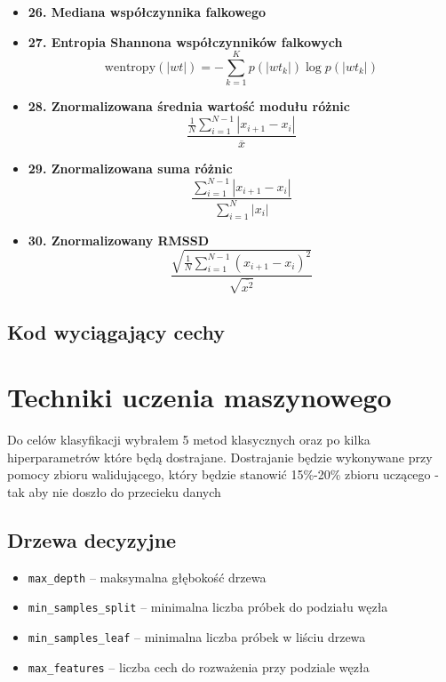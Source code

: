 \documentclass[12pt,titlepage]{article}
\begin{document}
\begin{itemize}
    \item \textbf{26. Mediana współczynnika falkowego}  


    \item \textbf{27. Entropia Shannona współczynników falkowych}  
    \[
    \text{wentropy}(|wt|) = -\sum_{k=1}^{K} p(|wt_k|) \log p(|wt_k|)
    \]

    \item \textbf{28. Znormalizowana średnia wartość modułu różnic}  
\[
\frac{\frac{1}{N}\sum_{i=1}^{N-1} |x_{i+1} - x_i|}{\overline{x}}
\]

    \item \textbf{29. Znormalizowana suma różnic}  
    \[
    \frac{\sum_{i=1}^{N-1} |x_{i+1} - x_i|}{\sum_{i=1}^{N} |x_i|}
    \]

    \item \textbf{30. Znormalizowany RMSSD}  
    \[
    \frac{\sqrt{\frac{1}{N}\sum_{i=1}^{N-1} (x_{i+1} - x_i)^2}}{\sqrt{\overline{x^2}}}
    \]
\end{itemize}
\newpage
\subsection{Kod wyciągający cechy}

\section{Techniki uczenia maszynowego}

Do celów klasyfikacji wybrałem 5 metod klasycznych oraz po kilka hiperparametrów które będą dostrajane. Dostrajanie będzie wykonywane przy pomocy zbioru walidującego, który będzie stanowić 15\%-20\% zbioru uczącego - tak aby nie doszło do przecieku danych 
\subsection{Drzewa decyzyjne}
\begin{itemize}
    \item \texttt{max\_depth} – maksymalna głębokość drzewa
    \item \texttt{min\_samples\_split} – minimalna liczba próbek do podziału węzła
    \item \texttt{min\_samples\_leaf} – minimalna liczba próbek w liściu drzewa
    \item \texttt{max\_features} – liczba cech do rozważenia przy podziale węzła
\end{itemize}
\end{document}
